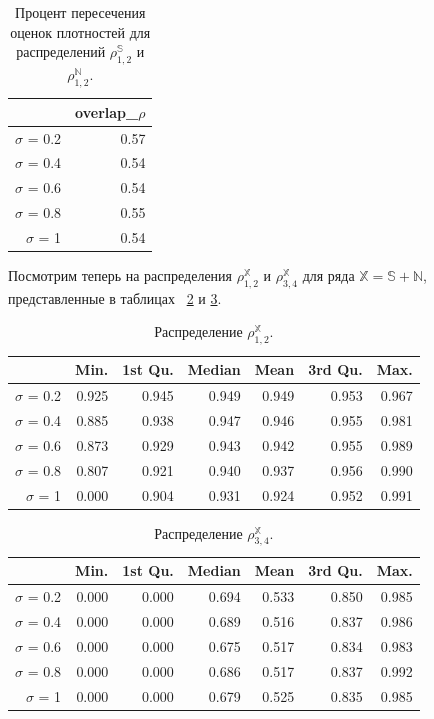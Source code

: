 \documentclass[specialist,
               substylefile = spbu.rtx,
               subf,href,colorlinks=true, 12pt]{disser}
\begin{document}
\begin{table}[hhh!]
\caption{Процент пересечения оценок плотностей для распределений $\rho^{\mathbb{S}}_{1,2}$ и $\rho^{\mathbb{N}}_{1,2}$.}
\centering
\begin{tabular}{rr}
  \hline
 & overlap\_$\rho$ \\
  \hline
$\sigma$ = 0.2 & 0.57 \\ 
  $\sigma$ = 0.4 & 0.54 \\ 
  $\sigma$ = 0.6 & 0.54 \\ 
  $\sigma$ = 0.8 & 0.55 \\ 
  $\sigma$ = 1 & 0.54 \\ 
   \hline
\end{tabular}
\label{tab:model_dist_pgram_overlap_222}
\end{table}

Посмотрим теперь на распределения  $\rho^{\mathbb{X}}_{1,2}$ и  $\rho^{\mathbb{X}}_{3,4}$ для ряда $\mathbb{X} = \mathbb{S} + \mathbb{N}$, представленные в таблицах ~\ref{tab:model_dist_pgram_sig_noise2} и \ref{tab:model_dist_pgram_sig_noise22}.

\begin{table}[hhh!]
\caption{Распределение $\rho^{\mathbb{X}}_{1,2}$.}
\centering
\begin{tabular}{rrrrrrr}
  \hline
 & Min. & 1st Qu. & Median & Mean & 3rd Qu. & Max. \\
  \hline
$\sigma$ = 0.2 & 0.925 & 0.945 & 0.949 & 0.949 & 0.953 & 0.967 \\ 
  $\sigma$ = 0.4 & 0.885 & 0.938 & 0.947 & 0.946 & 0.955 & 0.981 \\ 
  $\sigma$ = 0.6 & 0.873 & 0.929 & 0.943 & 0.942 & 0.955 & 0.989 \\ 
  $\sigma$ = 0.8 & 0.807 & 0.921 & 0.940 & 0.937 & 0.956 & 0.990 \\ 
  $\sigma$ = 1 & 0.000 & 0.904 & 0.931 & 0.924 & 0.952 & 0.991 \\ 
   \hline
\end{tabular}
\label{tab:model_dist_pgram_sig_noise2}
\end{table}

\begin{table}[hhh!]
\caption{Распределение $\rho^{\mathbb{X}}_{3,4}$.}
\centering
\begin{tabular}{rrrrrrr}
  \hline
 & Min. & 1st Qu. & Median & Mean & 3rd Qu. & Max. \\
  \hline
$\sigma$ = 0.2 & 0.000 & 0.000 & 0.694 & 0.533 & 0.850 & 0.985 \\ 
  $\sigma$ = 0.4 & 0.000 & 0.000 & 0.689 & 0.516 & 0.837 & 0.986 \\ 
  $\sigma$ = 0.6 & 0.000 & 0.000 & 0.675 & 0.517 & 0.834 & 0.983 \\ 
  $\sigma$ = 0.8 & 0.000 & 0.000 & 0.686 & 0.517 & 0.837 & 0.992 \\ 
  $\sigma$ = 1 & 0.000 & 0.000 & 0.679 & 0.525 & 0.835 & 0.985 \\ 
   \hline
\end{tabular}
\label{tab:model_dist_pgram_sig_noise22}
\end{table}
\end{document}

